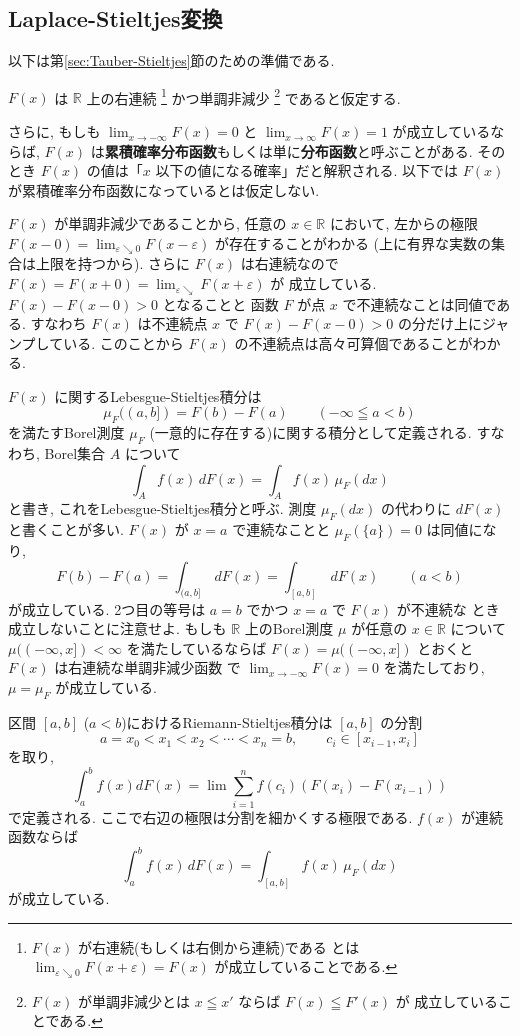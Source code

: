 \documentclass[12pt,twoside]{jarticle}
\newcommand\R{{\mathbb R}} %
\newcommand\eps{\varepsilon}
\theoremstyle{jplain}
\theoremstyle{jplain}
\theoremstyle{jplain}
\numberwithin{theorem}{section}
\numberwithin{equation}{section}
\numberwithin{figure}{section}
\numberwithin{table}{section}
\newcommand\secref[1]{第\ref{#1}節}
\begin{document}

\subsection{Laplace-Stieltjes変換}
\label{sec:Laplace-Stieltjes}

以下は\secref{sec:Tauber-Stieltjes}のための準備である.

$F(x)$ は $\R$ 上の右連続%
\footnote{$F(x)$ が右連続(もしくは右側から連続)である
とは $\lim_{\eps\searrow 0}F(x+\eps)=F(x)$ が成立していることである.}%
かつ単調非減少%
\footnote{$F(x)$ が単調非減少とは $x\leqq x'$ ならば $F(x)\leqq F'(x)$ が
成立していることである.}%
であると仮定する.

さらに, もしも $\lim_{x\to-\infty}F(x)=0$ と
$\lim_{x\to\infty}F(x)=1$ が成立しているならば,
$F(x)$ は{\bfseries 累積確率分布函数}もしくは単に{\bfseries 分布函数}と呼ぶことがある.
そのとき $F(x)$ の値は「$x$ 以下の値になる確率」だと解釈される.
以下では $F(x)$ が累積確率分布函数になっているとは仮定しない.


$F(x)$ が単調非減少であることから, 任意の $x\in\R$ において,
左からの極限 $F(x-0)=\lim_{\eps\searrow0}F(x-\eps)$ が存在することがわかる
(上に有界な実数の集合は上限を持つから).
さらに $F(x)$ は右連続なので $F(x)=F(x+0)=\lim_{\eps\searrow}F(x+\eps)$ が
成立している.  $F(x)-F(x-0)>0$ となることと
函数 $F$ が点 $x$ で不連続なことは同値である.
すなわち $F(x)$ は不連続点 $x$ で $F(x)-F(x-0)>0$ の分だけ上にジャンプしている.
このことから $F(x)$ の不連続点は高々可算個であることがわかる.

$F(x)$ に関するLebesgue-Stieltjes積分は
\[
\mu_F((a,b]) = F(b)-F(a) \qquad (-\infty\leqq a<b)
\]
を満たすBorel測度 $\mu_F$ (一意的に存在する)に関する積分として定義される.
すなわち, Borel集合 $A$ について
\[
\int_A f(x)\,dF(x)
=
\int_A f(x)\,\mu_F(dx)
\]
と書き, これをLebesgue-Stieltjes積分と呼ぶ.
測度 $\mu_F(dx)$ の代わりに $dF(x)$ と書くことが多い.
$F(x)$ が $x=a$ で連続なことと $\mu_F(\{a\})=0$ は同値になり,
\[
F(b)-F(a) = \int_{(a,b]}\,dF(x) = \int_{[a,b]}\,dF(x)
\qquad (a<b)
\]
が成立している. 2つ目の等号は $a=b$ でかつ $x=a$ で $F(x)$ が不連続な
とき成立しないことに注意せよ.
もしも $\R$ 上のBorel測度 $\mu$ が任意の $x\in\R$ について $\mu((-\infty,x])<\infty$
を満たしているならば $F(x)=\mu((-\infty,x])$ とおくと $F(x)$ は右連続な単調非減少函数
で $\lim_{x\to-\infty}F(x)=0$ を満たしており, $\mu=\mu_F$ が成立している.

区間 $[a,b]$ ($a<b$)におけるRiemann-Stieltjes積分は
$[a,b]$ の分割
\[
a=x_0< x_1<x_2<\cdots<x_n=b, \qquad c_i\in[x_{i-1},x_i]
\]
を取り,
\[
\int_a^b f(x)dF(x)
=\lim \sum_{i=1}^n f(c_i)(F(x_i)-F(x_{i-1}))
\]
で定義される. ここで右辺の極限は分割を細かくする極限である.
$f(x)$ が連続函数ならば
\[
\int_a^b f(x)\,dF(x) = \int_{[a,b]} f(x)\,\mu_F(dx)
\]
が成立している.
\end{document}

